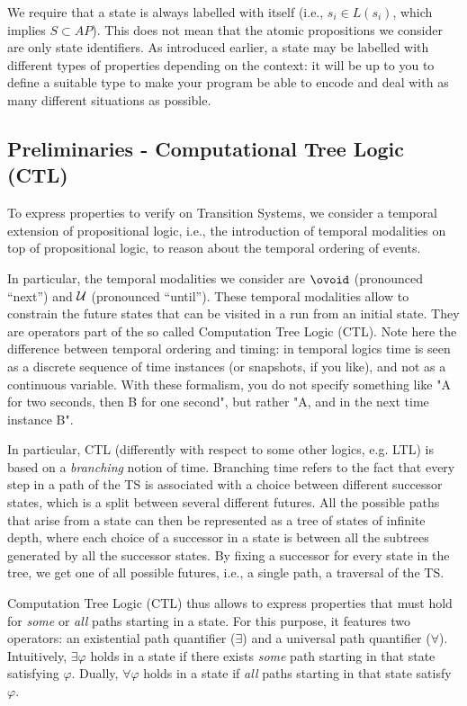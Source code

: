 \documentclass{article}
\begin{document}
We require that a state is always labelled with itself 
(i.e., $s_i \in L(s_i)$, which implies $S \subset AP$). 
This does not mean that the atomic propositions we consider are only state identifiers. 
As introduced earlier, a state may be labelled with different types of properties depending on the context: 
it will be up to you to define a suitable type to make your program be able to encode and 
deal with as many different situations as possible.

\subsection{Preliminaries - Computational Tree Logic (CTL)}
\label{subsec-ctl}

To express properties to verify on Transition Systems, we consider a temporal extension of propositional logic, 
i.e., the introduction of temporal modalities on top of propositional logic, to reason about the temporal ordering
of events.

In particular, the temporal modalities we consider are $\ovoid$ (pronounced ``next'') 
and $\mathbin{\mathcal{U}}$ (pronounced ``until''). These temporal modalities allow to constrain the future states 
that can be visited in a run from an initial state. They are operators part of the so called Computation Tree Logic (CTL).
Note here the difference between temporal ordering and timing: in temporal logics time is seen as a discrete sequence of time instances 
(or snapshots, if you like), and not as a continuous variable. With these formalism, 
you do not specify something like "A for two seconds, then B for one second", but rather "A, and in the next time instance B".

In particular, CTL (differently with respect to some other logics, e.g. LTL) is based on a \emph{branching} notion of time. 
Branching time refers to the fact that every step in a path of the TS is associated with a choice between 
different successor states, which is a split between several different futures. 
All the possible paths that arise from a state can then be represented
as a tree of states of infinite depth, where each choice of a successor in a state is between all the subtrees generated by all the successor states.
By fixing a successor for every state in the tree, we get one of all possible futures, 
i.e., a single path, a traversal of the TS.

Computation Tree Logic (CTL) thus allows to express properties that must hold for \emph{some} or \emph{all} paths starting in a state. 
For this purpose, it features two operators: an existential path quantifier ($\exists$) and a universal path quantifier ($\forall$). 
Intuitively, $\exists \varphi$ holds in a state if there exists \emph{some} path starting in that state satisfying $\varphi$. 
Dually, $\forall \varphi$ holds in a state if \emph{all} paths starting in that state satisfy $\varphi$.
\end{document}
